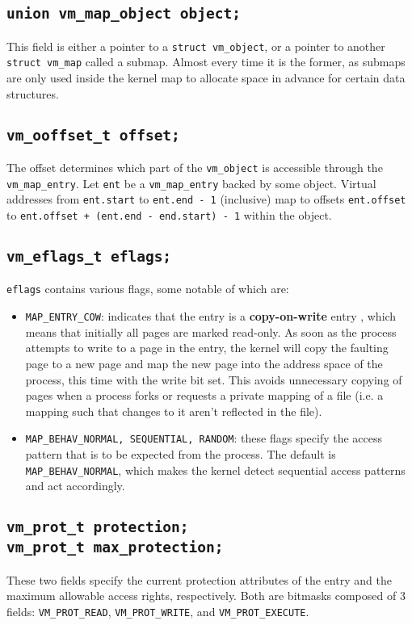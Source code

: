 \documentclass[shortabstract, english]{iithesis}
\begin{document}
\subsection*{\texttt{union vm_map_object object;}}
This field is either a pointer to a \texttt{struct vm_object}, or a
pointer to another \texttt{struct vm_map} called a submap. Almost every
time it is the former, as submaps are only used inside the kernel map to
allocate space in advance for certain data structures.

\subsection*{\texttt{vm_ooffset_t offset;}}
The offset determines which part of the \texttt{vm_object} is accessible
through the \texttt{vm_map_entry}. Let \texttt{ent} be a
\texttt{vm_map_entry} backed by some object. Virtual addresses from
\texttt{ent.start} to \texttt{ent.end - 1} (inclusive) map to
offsets \texttt{ent.offset} to
\texttt{ent.offset + (ent.end - end.start) - 1}
within the object.

\subsection*{\texttt{vm_eflags_t eflags;}}
\texttt{eflags} contains various flags, some notable of which are:
\begin{itemize}
\item \texttt{MAP_ENTRY_COW}: indicates that the entry is a
  \textbf{copy-on-write} entry \cite[Page~90]{bib:tanenbaum}, which means that
  initially all pages are marked read-only. As soon as the process attempts to
  write to a page in the entry, the kernel will copy the faulting page to a new
  page and map the new page into the address space of the process, this time
  with the write bit set. This avoids unnecessary copying of pages when a
  process forks or requests a private mapping of a file (i.e. a mapping such
  that changes to it aren't reflected in the file).
\item \texttt{MAP_BEHAV_{NORMAL, SEQUENTIAL, RANDOM}}: these flags
  specify the access pattern that is to be expected from the process. The
  default is \texttt{MAP_BEHAV_NORMAL}, which makes the kernel detect
  sequential access patterns and act accordingly.
\end{itemize}

\subsection*{\texttt{vm_prot_t protection;} \\
  \texttt{vm_prot_t max_protection;}}
These two fields specify the current protection attributes of the entry and the
maximum allowable access rights, respectively. Both are bitmasks composed of 3
fields: \texttt{VM_PROT_READ}, \texttt{VM_PROT_WRITE}, and
\texttt{VM_PROT_EXECUTE}.
\end{document}
